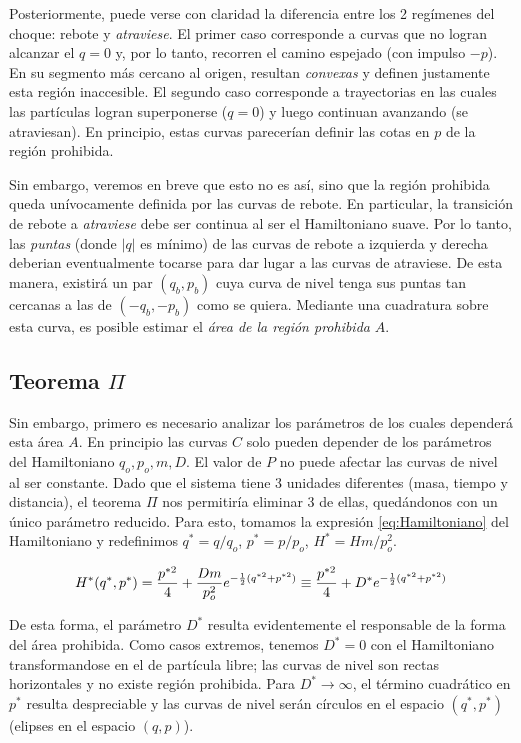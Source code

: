 \documentclass[twoside, 12pt]{article}
\begin{document}
Posteriormente, puede verse con claridad la diferencia entre los 2 regímenes del choque: rebote y \textit{atraviese}.
El primer caso corresponde a curvas que no logran alcanzar el $q=0$ y, por lo tanto, recorren el camino espejado (con impulso $-p$).
En su segmento más cercano al origen, resultan \textit{convexas} y definen justamente esta región inaccesible.
El segundo caso corresponde a trayectorias en las cuales las partículas logran superponerse ($q=0$) y luego continuan avanzando (se atraviesan).
En principio, estas curvas parecerían definir las cotas en $p$ de la región prohibida.

Sin embargo, veremos en breve que esto no es así, sino que la región prohibida queda unívocamente definida por las curvas de rebote.
En particular, la transición de rebote a \textit{atraviese} debe ser continua al ser el Hamiltoniano suave.
Por lo tanto, las \textit{puntas} (donde $|q|$ es mínimo) de las curvas de rebote a izquierda y derecha deberian eventualmente tocarse para dar lugar a las curvas de atraviese.
De esta manera, existirá un par $(q_b, p_b)$ cuya curva de nivel tenga sus puntas tan cercanas a las de $(-q_b, -p_b)$ como se quiera.
Mediante una cuadratura sobre esta curva, es posible estimar el \textit{área de la región prohibida} $A$.

\subsection{Teorema $\Pi$}

Sin embargo, primero es necesario analizar los parámetros de los cuales dependerá esta área $A$.
En principio las curvas $C$ solo pueden depender de los parámetros del Hamiltoniano $q_o, p_o, m, D$. El valor de $P$ no puede afectar las curvas de nivel al ser constante.
Dado que el sistema tiene 3 unidades diferentes (masa, tiempo y distancia), el teorema $\Pi$ nos permitiría eliminar 3 de ellas, quedándonos con un único parámetro reducido.
Para esto, tomamos la expresión \eqref{eq:Hamiltoniano} del Hamiltoniano y redefinimos $q^* = q/q_o$, $p^* = p/p_o$, $H^* = Hm/p_o^2$.

\begin{equation}{\label{eq:ham_red}}
 H^*(q^*, p^*) = \frac{p^{*2}}{4} + \frac{Dm}{p_o^2}e^{-\frac{1}{2}(q^{*2}+p^{*2})} \equiv \frac{p^{*2}}{4} + D^* e^{-\frac{1}{2}(q^{*2}+p^{*2})}
\end{equation}

De esta forma, el parámetro $D^*$ resulta evidentemente el responsable de la forma del área prohibida.
Como casos extremos, tenemos $D^* = 0$ con el Hamiltoniano transformandose en el de partícula libre; las curvas de nivel son rectas horizontales y no existe región prohibida.
Para $D^* \rightarrow \infty$, el término cuadrático en $p^*$ resulta despreciable y las curvas de nivel serán círculos en el espacio $(q^*, p^*)$ (elipses en el espacio $(q,p)$).
\end{document}
